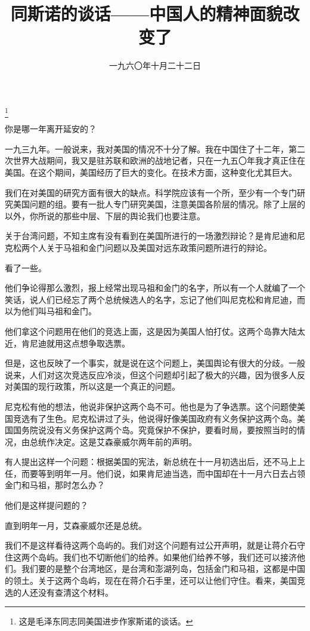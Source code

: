 
\title{同斯诺的谈话——中国人的精神面貌改变了}
\date{一九六〇年十月二十二日}
\thanks{这是毛泽东同志同美国进步作家斯诺的谈话。}
\maketitle


你是哪一年离开延安的？

一九三九年。一般说来，我对美国的情况不十分了解。我在中国住了十二年，第二次世界大战期间，我又是驻苏联和欧洲的战地记者，只在一九五〇年我才真正住在美国。在这个期间，美国经历了巨大的变化。在技术方面，这种变化尤其巨大。

我们在对美国的研究方面有很大的缺点。科学院应该有一个所，至少有一个专门研究美国问题的组。要有一批人专门研究美国，注意美国各阶层的情况。除了上层的以外，你所说的那些中层、下层的舆论我们也要注意。

关于台湾问题，不知主席有没有看到在美国所进行的一场激烈辩论？是肯尼迪和尼克松两个人关于马祖和金门问题以及美国对远东政策问题所进行的辩论。

看了一些。

他们争论得那么激烈，报上经常出现马祖和金门的名字，所以有一个人就编了一个笑话，说人们已经忘了两个总统候选人的名字，忘记了他们叫尼克松和肯尼迪，而以为他们叫马祖和金门。

他们拿这个问题用在他们的竞选上面，这是因为美国人怕打仗。这两个岛靠大陆太近，肯尼迪就用这点想争取选票。

但是，这也反映了一个事实，就是说在这个问题上，美国舆论有很大的分歧。一般说来，人们对这次竞选反应冷淡，但这个问题却引起了极大的兴趣，因为很多人反对美国的现行政策，所以这是一个真正的问题。

尼克松有他的想法，他说非保护这两个岛不可。他也是为了争选票。这个问题使美国竞选有了生色。尼克松讲过了头，他说得好像美国政府有义务保护这两个岛。美国国务院说没有义务保护这两个岛。究竟保护不保护，要看时局，要按照当时的情况，由总统作决定。这是艾森豪威尔两年前的声明。

有人提出这样一个问题：根据美国的宪法，新总统在十一月初选出后，还不马上上任，而要等到明年一月。他们说，如果肯尼迪当选，而中国却在十一月六日去占领金门和马祖，那时怎么办？

他们是这样提问题的？

直到明年一月，艾森豪威尔还是总统。

我们不是这样看待这两个岛屿的。我们对这个问题有过公开声明，就是让蒋介石守住这两个岛屿。我们也不切断他们的给养。如果他们给养不够，我们还可以接济他们。我们要的是整个台湾地区，是台湾和澎湖列岛，包括金门和马祖，这都是中国的领土。关于这两个岛屿，现在在蒋介石手里，还可以让他们守住。看来，美国竞选的人还没有查清这个材料。

